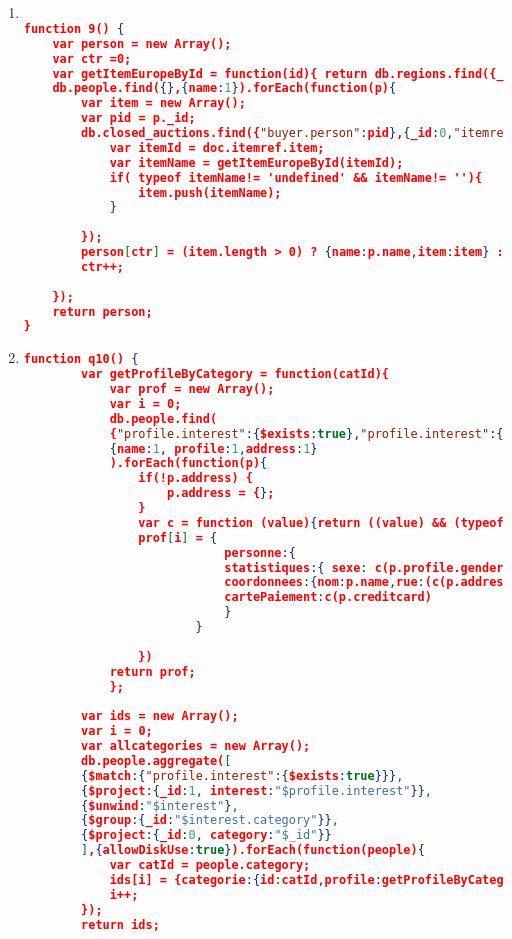 \begin{enumerate}[label=Q\arabic*]
\begin{lstlisting}[language=JSON,   basicstyle=\scriptsize]
		item[ct] = {person:people.name,count:count};
		ct++;
	});
	
	return item;
 }
        
	\end{lstlisting}
	
    \item \label{mongodb-q-9}%
    \begin{lstlisting}[language=JSON,   basicstyle=\scriptsize]
	
function 9() {
    var person = new Array();
	var ctr =0;
	var getItemEuropeById = function(id){ return db.regions.find({_id:id, regions:"europe"},{_id:0,name:1}).name;};
	db.people.find({},{name:1}).forEach(function(p){
		var item = new Array();
		var pid = p._id;
		db.closed_auctions.find({"buyer.person":pid},{_id:0,"itemref.item":1}).forEach(function(doc){
			var itemId = doc.itemref.item;
			var itemName = getItemEuropeById(itemId);
			if( typeof itemName!= 'undefined' && itemName!= ''){
				item.push(itemName);
			}
			
		});
		person[ctr] = (item.length > 0) ? {name:p.name,item:item} : {name:p.name}; 
		ctr++;
		
	});	
	return person;
}

	\end{lstlisting}
	
	
    \item \label{mongodb-q-10}%
	\begin{lstlisting}[language=JSON,   basicstyle=\scriptsize]
	function q10() {
	    var getProfileByCategory = function(catId){
    		var prof = new Array();
    		var i = 0;
    		db.people.find(
    		{"profile.interest":{$exists:true},"profile.interest":{"$elemMatch": {category:catId}}},
    		{name:1, profile:1,address:1}
    		).forEach(function(p){
    			if(!p.address) {
    				p.address = {};
    			}
    			var c = function (value){return ((value) && (typeof value !== "undefined")) ? value : "";}; 
    			prof[i] = {
    						personne:{
    						statistiques:{ sexe: c(p.profile.gender), age:c(p.profile.gender),education:c(p.profile.education),revenu:c(p.profile.income)},
    						coordonnees:{nom:p.name,rue:(c(p.address) && c(p.address.street)),ville:c(p.address.city),pays:c(p.address.country),reseau:{courrier:c(p.emailaddress), pagePerso:c(p.homepage)}},
    						cartePaiement:c(p.creditcard)
    						} 
    					}
    			
    			})
    		return prof;
    		};
        
        var ids = new Array();
    	var i = 0;
    	var allcategories = new Array();
    	db.people.aggregate([
    	{$match:{"profile.interest":{$exists:true}}},
    	{$project:{_id:1, interest:"$profile.interest"}},
    	{$unwind:"$interest"},
    	{$group:{_id:"$interest.category"}},
    	{$project:{_id:0, category:"$_id"}}
    	],{allowDiskUse:true}).forEach(function(people){
    		var catId = people.category;
    		ids[i] = {categorie:{id:catId,profile:getProfileByCategory(catId)}}
    		i++;
    	});
    	return ids;
    

\end{lstlisting}
\end{enumerate}

